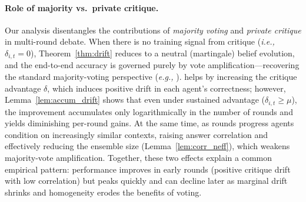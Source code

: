 \paragraph{Role of majority vs.\ private critique.}
Our analysis disentangles the contributions of \emph{majority voting} and \emph{private critique} in multi-round debate.
When there is no training signal from critique (\emph{i.e.,} $\delta_{i,t}=0$), Theorem~\ref{thm:drift} reduces to a neutral (martingale) belief evolution, and the end-to-end accuracy is governed purely by vote amplification—recovering the standard majority-voting perspective (\emph{e.g.,} \cite{choi2025debate}).
\SDRL{} helps by increasing the critique advantage $\delta$, which induces positive drift in each agent’s correctness; however, Lemma~\ref{lem:accum_drift} shows that even under sustained advantage ($\delta_{i,t}\ge \mu$), the improvement accumulates only logarithmically in the number of rounds and yields diminishing per-round gains.
At the same time, as rounds progress agents condition on increasingly similar contexts, raising answer correlation and effectively reducing the ensemble size (Lemma~\ref{lem:corr_neff}), which weakens majority-vote amplification.
Together, these two effects explain a common empirical pattern: performance improves in early rounds (positive critique drift with low correlation) but peaks quickly and can decline later as marginal drift shrinks and homogeneity erodes the benefits of voting.

